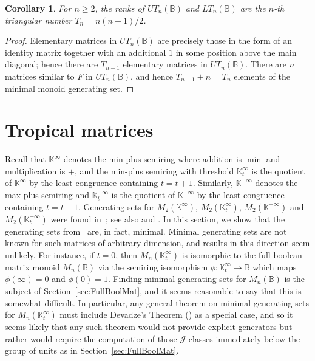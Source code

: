\documentclass[11pt]{article}
\newtheorem{cor}[thm]{Corollary}
\numberwithin{equation}{section}
\renewcommand{\to}{\longrightarrow}
\newcommand{\B}{\mathbb{B}}
\newcommand{\Bn}{M_n(\B)}
\newcommand{\UTn}{UT_n(\B)}
\newcommand{\LTn}{LT_n(\B)}
\newcommand{\J}{\mathscr{J}}
\newcommand{\K}{\mathbb{K}}
\newcommand{\Kmin}{\K^{\infty}}
\newcommand{\Kmint}{\K^{\infty}_t}
\newcommand{\Kmax}{\K^{-\infty}}
\newcommand{\Kmaxt}{\K^{-\infty}_t}
\begin{document}
\begin{cor}
  For $n \geq 2$, the ranks of $\UTn$ and $\LTn$ are the $n$-th triangular number
  $T_n = n(n+1)/2$.
\end{cor}
\begin{proof}
  Elementary matrices in $\UTn$ are precisely those in the form of an identity
  matrix together with an additional $1$ in some position above the main
  diagonal; hence there are $T_{n - 1}$ elementary matrices in $\UTn$. There are
  $n$ matrices similar to $F$ in $\UTn$, and hence $T_{n - 1} + n =  T_n$
  elements of the minimal monoid generating set.
\end{proof}


\section{Tropical matrices}
\label{sec:Tropical}
Recall that $\Kmin$ denotes the min-plus semiring where addition is $\min$ and
multiplication is $+$, and the min-plus semiring with threshold $\Kmint$ is the
quotient of $\Kmin$ by the least congruence containing $t = t+ 1$. Similarly,
$\Kmax$ denotes the max-plus semiring and $\Kmaxt$ is the quotient of $\Kmax$ by
the least congruence containing $t = t + 1$. Generating
sets for $M_2(\Kmin)$, $M_2(\Kmint)$, $M_2(\Kmax)$ and $M_2(\Kmaxt)$ were found
in~\cite{East2020aa}; see also  and
. In this section, we show that the generating
sets from~\cite{East2020aa} are, in fact, minimal. Minimal generating sets are
not known for such matrices of arbitrary dimension, and results in this
direction seem unlikely. For instance, if $t = 0$, then $M_n(\Kmint)$ is
isomorphic to the full boolean matrix monoid $\Bn$ via the semiring isomorphism
$\phi: \Kmint \to \B$ which maps $\phi(\infty) = 0$ and $\phi(0) = 1$. Finding
minimal generating sets for $\Bn$ is the subject of
Section~\ref{sec:FullBoolMat}, and it seems reasonable to say that this is
somewhat difficult. In particular, any general theorem on minimal generating
sets for $M_n(\Kmint)$ must include Devadze's Theorem ()
as a special case, and so it seems likely that any such theorem would not
provide explicit generators but rather would require the computation of those
$\J$-classes immediately below the group of units as in
Section~\ref{sec:FullBoolMat}.
\end{document}
